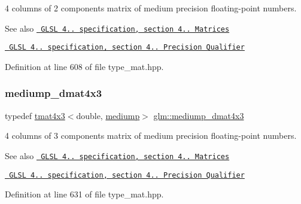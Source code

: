 4 columns of 2 components matrix of medium precision floating-\/point numbers.

\begin{DoxySeeAlso}{See also}
\href{http://www.opengl.org/registry/doc/GLSLangSpec.4.20.8.pdf}{\texttt{ G\+L\+SL 4.. specification, section 4.. Matrices}} 

\href{http://www.opengl.org/registry/doc/GLSLangSpec.4.20.8.pdf}{\texttt{ G\+L\+SL 4.. specification, section 4.. Precision Qualifier}} 
\end{DoxySeeAlso}


Definition at line 608 of file type\+\_\+mat.\+hpp.

\mbox{\label{group__core__precision_ga9870d3f13ee4601a8abf75f6b54440b9}} 
\subsubsection{\texorpdfstring{mediump\_dmat4x3}{mediump\_dmat4x3}}
{\footnotesize\ttfamily typedef \mbox{\hyperlink{structglm_1_1tmat4x3}{tmat4x3}}$<$double, \mbox{\hyperlink{namespaceglm_a0f04f086094c747d227af4425893f545a6416f3ea0c9025fb21ed50c4d6620482}{mediump}}$>$ \mbox{\hyperlink{group__core__precision_ga9870d3f13ee4601a8abf75f6b54440b9}{glm\+::mediump\+\_\+dmat4x3}}}

4 columns of 3 components matrix of medium precision floating-\/point numbers.

\begin{DoxySeeAlso}{See also}
\href{http://www.opengl.org/registry/doc/GLSLangSpec.4.20.8.pdf}{\texttt{ G\+L\+SL 4.. specification, section 4.. Matrices}} 

\href{http://www.opengl.org/registry/doc/GLSLangSpec.4.20.8.pdf}{\texttt{ G\+L\+SL 4.. specification, section 4.. Precision Qualifier}} 
\end{DoxySeeAlso}


Definition at line 631 of file type\+\_\+mat.\+hpp.

\mbox{\label{group__core__precision_ga6dc4057e30931ebd0b5d7e44ef27763a}} 

